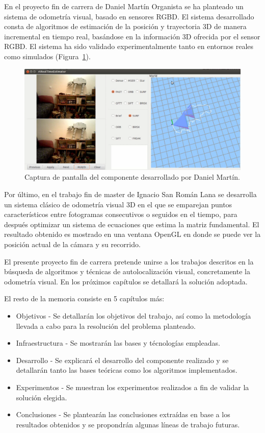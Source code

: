 \newpage

En el proyecto fin de carrera de Daniel Martín Organista \parencite{ref5} se ha planteado un sistema de odometría visual, basado en sensores RGBD. El sistema desarrollado consta de algoritmos de estimación de la posición y trayectoria 3D de manera incremental en tiempo real, basándose en la información 3D ofrecida por el sensor RGBD. El sistema ha sido validado experimentalmente tanto en entornos reales como simulados (Figura~\ref{fig:dani}).

\begin{figure}[th]
\centering
\includegraphics[scale=0.2]{Figures/cap-dani.png}
\decoRule
\caption[Captura de pantalla, PFC de Daniel Martín]{Captura de pantalla del componente desarrollado por Daniel Martín.}
\label{fig:dani}
\end{figure}

Por último, en el trabajo fin de master de Ignacio San Román Lana \parencite{ref4} se desarrolla un sistema clásico de odometría visual 3D en el que se emparejan puntos característicos entre fotogramas consecutivos o seguidos en el tiempo, para después optimizar un sistema de ecuaciones que estima la matriz fundamental. El resultado obtenido es mostrado en una ventana OpenGL en donde se puede ver la posición actual de la cámara y su recorrido.

El presente proyecto fin de carrera pretende unirse a los trabajos descritos en la búsqueda de algoritmos y técnicas de autolocalización visual, concretamente la odometría visual. En los próximos capítulos se detallará la solución adoptada.

El resto de la memoria consiste en 5 capítulos más:
\begin{itemize}
\item Objetivos - Se detallarán los objetivos del trabajo, así como la metodología llevada a cabo para la resolución del problema planteado.
\item Infraestructura - Se mostrarán las bases y técnologías empleadas.
\item Desarrollo - Se explicará el desarrollo del componente realizado y se detallarán tanto las bases teóricas como los algoritmos implementados.
\item Experimentos - Se muestran los experimentos realizados a fin de validar la solución elegida.
\item Conclusiones - Se plantearán las conclusiones extraídas en base a los resultados obtenidos y se propondrán algunas líneas de trabajo futuras.

\end{itemize}